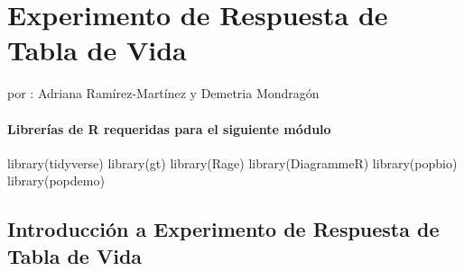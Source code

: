 \documentclass[
  12pt,
  letterpaper,
]{book}
\author{}
\date{}
\newenvironment{Shaded}{\begin{snugshade}}{\end{snugshade}}
\newcommand{\FunctionTok}[1]{\textcolor[rgb]{0.28,0.35,0.67}{#1}}
\newcommand{\NormalTok}[1]{\textcolor[rgb]{0.00,0.23,0.31}{#1}}
\renewcommand*\contentsname{Table of contents}
\newcommand\contentsname{Table of contents}
\begin{document}
\frontmatter

\renewcommand*\contentsname{Table of contents}
{
\hypersetup{linkcolor=}
\setcounter{tocdepth}{2}
\tableofcontents
}

\mainmatter
\chapter{Experimento de Respuesta de Tabla de Vida}\label{ERTV}

por : Adriana Ramírez-Martínez y Demetria Mondragón

\subsubsection{Librerías de R requeridas para el siguiente
módulo}\label{libreruxedas-de-r-requeridas-para-el-siguiente-muxf3dulo}

\begin{Shaded}
\begin{Highlighting}[]
\FunctionTok{library}\NormalTok{(tidyverse)}
\FunctionTok{library}\NormalTok{(gt)}
\FunctionTok{library}\NormalTok{(Rage)}
\FunctionTok{library}\NormalTok{(DiagrammeR)}
\FunctionTok{library}\NormalTok{(popbio)}
\FunctionTok{library}\NormalTok{(popdemo)}
\end{Highlighting}
\end{Shaded}

\section{\texorpdfstring{Introducción a \textbf{Experimento de Respuesta
de Tabla de
Vida}}{Introducción a Experimento de Respuesta de Tabla de Vida}}\label{introducciuxf3n-a-experimento-de-respuesta-de-tabla-de-vida}
\end{document}
